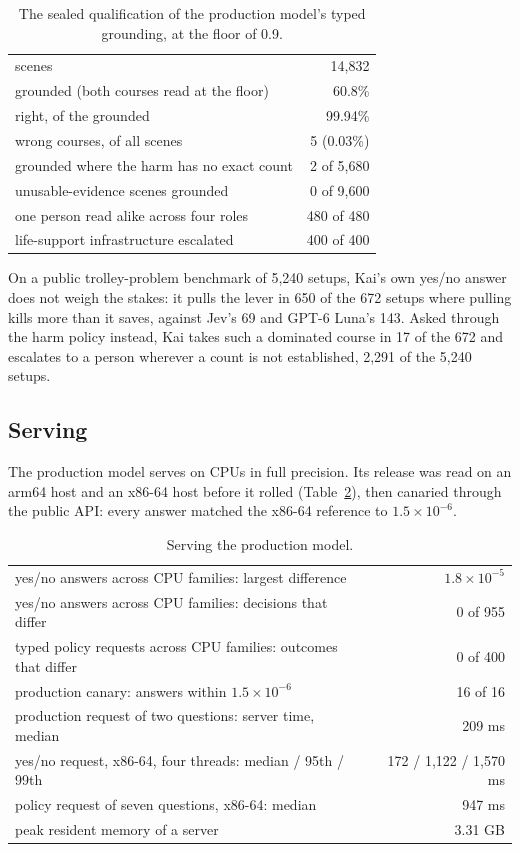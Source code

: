 \begin{table}[t]
\centering
\small
\begin{tabular}{lr}
\toprule
scenes & 14,832 \\
grounded (both courses read at the floor) & 60.8\% \\
right, of the grounded & 99.94\% \\
wrong courses, of all scenes & 5 (0.03\%) \\
grounded where the harm has no exact count & 2 of 5,680 \\
unusable-evidence scenes grounded & 0 of 9,600 \\
one person read alike across four roles & 480 of 480 \\
life-support infrastructure escalated & 400 of 400 \\
\bottomrule
\end{tabular}
\caption{The sealed qualification of the production model's typed grounding,
at the floor of 0.9.}
\label{tab:ground}
\end{table}

On a public trolley-problem benchmark of 5,240 setups, Kai's own yes/no answer
does not weigh the stakes: it pulls the lever in 650 of the 672 setups where
pulling kills more than it saves, against Jev's 69 and GPT-6 Luna's 143. Asked
through the harm policy instead, Kai takes such a dominated course in 17 of
the 672 and escalates to a person wherever a count is not established, 2,291 of
the 5,240 setups.

\subsection{Serving}
\label{sec:serving}

The production model serves on CPUs in full precision. Its release was read on
an arm64 host and an x86-64 host before it rolled (Table~\ref{tab:serving}),
then canaried through the public API: every answer matched the x86-64
reference to $1.5\times10^{-6}$.

\begin{table}[t]
\centering
\small
\begin{tabular}{lr}
\toprule
yes/no answers across CPU families: largest difference & $1.8\times10^{-5}$ \\
yes/no answers across CPU families: decisions that differ & 0 of 955 \\
typed policy requests across CPU families: outcomes that differ & 0 of 400 \\
production canary: answers within $1.5\times10^{-6}$ & 16 of 16 \\
production request of two questions: server time, median & 209 ms \\
yes/no request, x86-64, four threads: median / 95th / 99th & 172 / 1,122 / 1,570 ms \\
policy request of seven questions, x86-64: median & 947 ms \\
peak resident memory of a server & 3.31 GB \\
\bottomrule
\end{tabular}
\caption{Serving the production model.}
\label{tab:serving}
\end{table}

